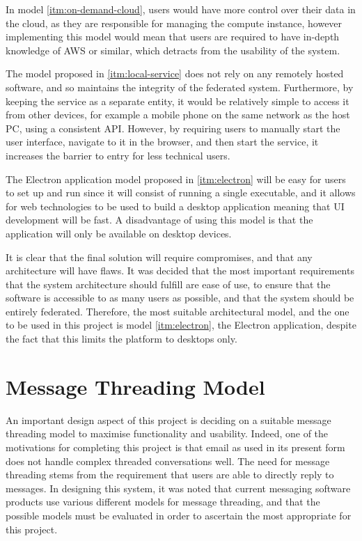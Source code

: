 In model \ref{itm:on-demand-cloud}, users would have more control over their data in the cloud, as they are responsible for managing the compute instance, however implementing this model would mean that users are required to have in-depth knowledge of AWS or similar, which detracts from the usability of the system.

The model proposed in \ref{itm:local-service} does not rely on any remotely hosted software, and so maintains the integrity of the federated system. Furthermore, by keeping the service as a separate entity, it would be relatively simple to access it from other devices, for example a mobile phone on the same network as the host PC, using a consistent API. However, by requiring users to manually start the user interface, navigate to it in the browser, and then start the service, it increases the barrier to entry for less technical users.

The Electron application model proposed in \ref{itm:electron} will be easy for users to set up and run since it will consist of running a single executable, and it allows for web technologies to be used to build a desktop application meaning that UI development will be fast. A disadvantage of using this model is that the application will only be available on desktop devices.

It is clear that the final solution will require compromises, and that any architecture will have flaws. It was decided that the most important requirements that the system architecture should fulfill are ease of use, to ensure that the software is accessible to as many users as possible, and that the system should be entirely federated. Therefore, the most suitable architectural model, and the one to be used in this project is model \ref{itm:electron}, the Electron application, despite the fact that this limits the platform to desktops only.

\section{Message Threading Model}\label{sec:message-threading-model}
An important design aspect of this project is deciding on a suitable message threading model to maximise functionality and usability. Indeed, one of the motivations for completing this project is that email as used in its present form does not handle complex threaded conversations well. The need for message threading stems from the requirement that users are able to directly reply to messages. In designing this system, it was noted that current messaging software products use various different models for message threading, and that the possible models must be evaluated in order to ascertain the most appropriate for this project.

